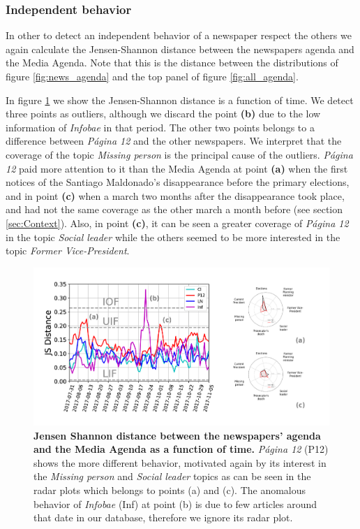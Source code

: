 \subsubsection{Independent behavior}

\par In other to detect an independent behavior of a newspaper respect the others we again calculate the Jensen-Shannon distance between the newspapers agenda and the Media Agenda.
Note that this is the distance between the distributions of figure \ref{fig:news_agenda} and the top panel of figure \ref{fig:all_agenda}.
\par In figure \ref{fig:jensen_shannon_news} we show the Jensen-Shannon distance is a function of time.
We detect three points as outliers, although we discard the point \textbf{(b)} due to the low information of \emph{Infobae} in that period. 
The other two points belongs to a difference between \emph{Página 12} and the other newspapers. 
We interpret that the coverage of the topic \emph{Missing person} is the principal cause of the outliers.
\emph{Página 12} paid more attention to it than the Media Agenda at point \textbf{(a)} when the first notices of the Santiago Maldonado's disappearance before the primary elections, and in point \textbf{(c)} when a march two months after the disappearance took place, and had not the same coverage as the other march a month before (see section \ref{sec:Context}). Also, in point \textbf{(c)}, it can be seen a greater coverage of \emph{Página 12} in the topic \emph{Social leader} while the others seemed to be more interested in the topic \emph{Former Vice-President}.

\begin{figure}[h]
\centering
\includegraphics[width = \textwidth]{images/Fig6.pdf}
\caption{\textbf{Jensen Shannon distance between the newspapers’ agenda and the Media Agenda as a function of time.} \emph{Página 12} (P12) shows the more different behavior, motivated again by its interest in the \emph{Missing person} and \emph{Social leader} topics as can be seen in the radar plots which belongs to points (a) and (c). 
The anomalous behavior of \emph{Infobae} (Inf) at point (b) is due to few articles around that date in our database, therefore we ignore its radar plot.}
\label{fig:jensen_shannon_news}
\end{figure}

